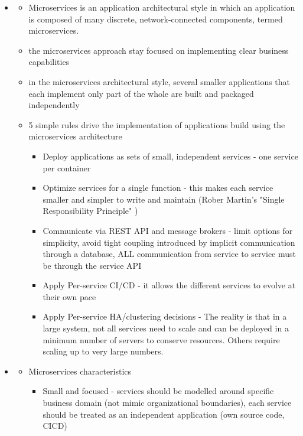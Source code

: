 \begin{itemize}
\begin{itemize}
\begin{itemize}
		\end{itemize}
	\end{itemize}
	\item \cite{ImplPatternsMicrosServices}
	\begin{itemize}
		\item Microservices is an application architectural style in which an application is composed of many discrete, network-connected components, termed microservices.
		\item the microservices approach stay focused on implementing clear business capabilities
		\item in the microservices architectural style, several smaller applications that each implement only part of the whole are built and packaged independently
		\item 5 simple rules drive the implementation of applications build using the microservices architecture
		\begin{itemize}
			\item Deploy applications as sets of small, independent services - one service per container
			\item Optimize services for a single function - this makes each service smaller and simpler to write and maintain (Rober Martin's "Single Responsibility Principle" \cite{RobertMartinOOP})
			\item Communicate via REST API and message brokers - limit options for simplicity, avoid tight coupling introduced by implicit communication through a database, ALL communication from service to service must be through the service API
			\item Apply Per-service CI/CD - it allows the different services to evolve at their own pace
			\item Apply Per-service HA/clustering decisions - The reality is that in a large system, not all services need to scale and can be deployed in a minimum number of servers to conserve resources. Others require scaling up to very large
			numbers.
		\end{itemize}
	\end{itemize}
	\item \cite{MicroservicesDocker}
	\begin{itemize}
		\item Microservices characteristics
		\begin{itemize}
			\item Small and focused - services should be modelled around specific business domain (not mimic organizational boundaries), each service should be treated as an independent application (own source code, CICD)

\end{itemize}
\end{itemize}
\end{itemize}
